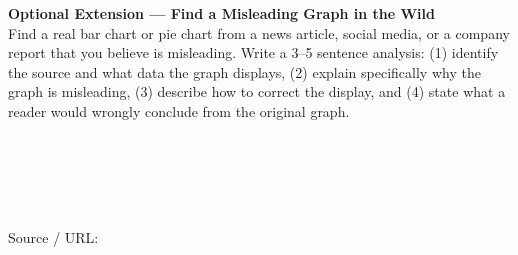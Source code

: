 \documentclass[10pt]{article}
\begin{document}
\vspace{0.14in}

\begin{extensionbox}
\small
\textbf{Optional Extension --- Find a Misleading Graph in the Wild}\\[4pt]
Find a real bar chart or pie chart from a news article, social media, or a
company report that you believe is misleading. Write a 3--5 sentence analysis:
(1) identify the source and what data the graph displays, (2) explain specifically
why the graph is misleading, (3) describe how to correct the display, and (4) state
what a reader would wrongly conclude from the original graph.

\vspace{8pt}
\writeline\\[1pt]\writeline\\[1pt]\writeline\\[1pt]\writeline\\[1pt]\writeline

\vspace{4pt}
\textcolor{slate}{\scriptsize Source / URL:\;\blank{11cm}}
\end{extensionbox}
\end{document}
